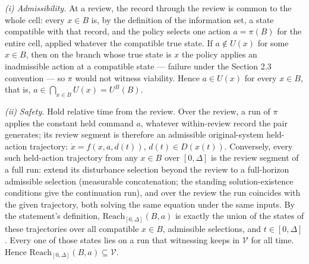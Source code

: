 \documentclass[11pt]{article}
\theoremstyle{definition}
\begin{document}
\emph{(i) Admissibility.} At a review, the record through the review is
common to the whole cell: every \(x \in B\) is, by the definition of
the information set, a state compatible with that record, and the
policy selects one action \(a = \pi(B)\) for the entire cell, applied
whatever the compatible true state. If \(a \notin U(x)\) for some
\(x \in B\), then on the branch whose true state is \(x\) the policy
applies an inadmissible action at a compatible state --- failure under
the Section 2.3 convention --- so \(\pi\) would not witness viability.
Hence \(a \in U(x)\) for every \(x \in B\), that is,
\(a \in \bigcap_{x \in B} U(x) = U^{B}(B)\).

\emph{(ii) Safety.} Hold relative time from the review. Over the
review, a run of \(\pi\) applies the constant held command \(a\),
whatever within-review record the pair generates; its review segment is
therefore an admissible original-system held-action trajectory:
\(\dot x = f(x, a, d(t))\), \(d(t) \in D(x(t))\). Conversely, every
such held-action trajectory from any \(x \in B\) over \([0, \Delta]\)
is the review segment of a full run: extend its disturbance selection
beyond the review to a full-horizon admissible selection (measurable
concatenation; the standing solution-existence conditions give the
continuation run), and over the review the run coincides with the given
trajectory, both solving the same equation under the same inputs. By
the statement's definition, \(\mathrm{Reach}_{[0,\Delta]}(B, a)\) is
exactly the union of the states of these trajectories over all
compatible \(x \in B\), admissible selections, and \(t \in [0,
\Delta]\). Every one of those states lies on a run that witnessing
keeps in \(\mathcal{V}\) for all time. Hence
\(\mathrm{Reach}_{[0,\Delta]}(B, a) \subseteq \mathcal{V}\).
\end{document}
